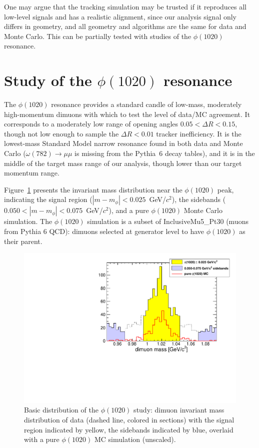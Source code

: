\documentclass[12pt]{article}
\begin{document}
One may argue that the tracking simulation may be trusted if it
reproduces all low-level signals and has a realistic alignment, since
our analysis signal only differs in geometry, and all geometry and
algorithms are the same for data and Monte Carlo.  This can be
partially tested with studies of the $\phi(1020)$ resonance.

\section{Study of the $\phi(1020)$ resonance}

The $\phi(1020)$ resonance provides a standard candle of low-mass,
moderately high-momentum dimuons with which to test the level of
data/MC agreement.  It corresponds to a moderately low range of
opening angles $0.05 < \Delta R < 0.15$, though not low enough to
sample the $\Delta R < 0.01$ tracker inefficiency.  It is the
lowest-mass Standard Model narrow resonance found in both data and
Monte Carlo ($\omega(782) \to \mu\mu$ is missing from the Pythia~6
decay tables), and it is in the middle of the target mass range of our
analysis, though lower than our target momentum range.

Figure~\ref{fig:phi_mass} presents the invariant mass distribution
near the $\phi(1020)$ peak, indicating the signal region ($|m -
m_\phi| < 0.025$~GeV/$c^2$), the sidebands ($0.050 < |m -
m_\phi| < 0.075$~GeV/$c^2$), and a pure $\phi(1020)$ Monte Carlo
simulation.  The $\phi(1020)$ simulation is a subset of
InclusiveMu5\_Pt30 (muons from Pythia 6 QCD): dimuons selected at
generator level to have $\phi(1020)$ as their parent.

\begin{figure}
\begin{center}
\includegraphics[width=0.75\linewidth]{phi_mass.pdf}
\end{center}

\caption{Basic distribution of the $\phi(1020)$ study: dimuon
  invariant mass distribution of data (dashed line, colored in
  sections) with the signal region indicated by yellow, the sidebands
  indicated by blue, overlaid with a pure $\phi(1020)$ MC simulation
  (unscaled). \label{fig:phi_mass}}
\end{figure}
\end{document}
